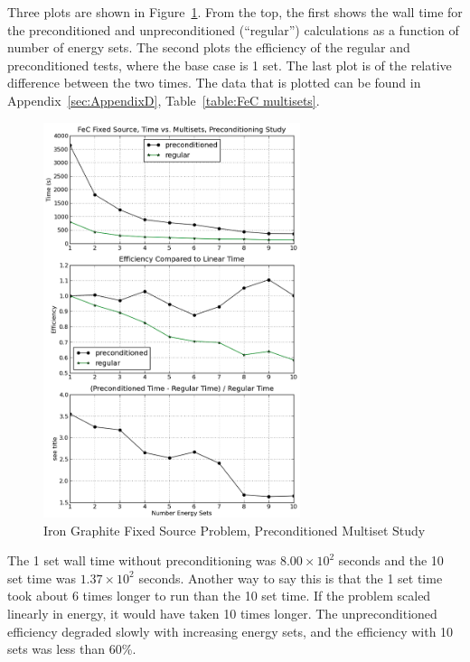 Three plots are shown in Figure~\ref{fig:FeC multisets}. From the top, the first shows the wall time for the preconditioned and unpreconditioned (``regular'') calculations as a function of number of energy sets. The second plots the efficiency of the regular and preconditioned tests, where the base case is 1 set. The last plot is of the relative difference between the two times. The data that is plotted can be found in Appendix~\ref{sec:AppendixD}, Table~\ref{table:FeC multisets}.
%
\begin{figure}[!ht]
    \begin{center}
      \includegraphics [width=0.67\textwidth, height=0.85\textheight] {FeCmultisets}
   \end{center}
   \caption{Iron Graphite Fixed Source Problem, Preconditioned Multiset Study}
   \label{fig:FeC multisets}
\end{figure}

The 1 set wall time without preconditioning was $8.00 \times 10^{2}$ seconds and the 10 set time was $1.37 \times 10^{2}$ seconds. Another way to say this is that the 1 set time took about 6 times longer to run than the 10 set time. If the problem scaled linearly in energy, it would have taken 10 times longer. The unpreconditioned efficiency degraded slowly with increasing energy sets, and the efficiency with 10 sets was less than 60\%.

